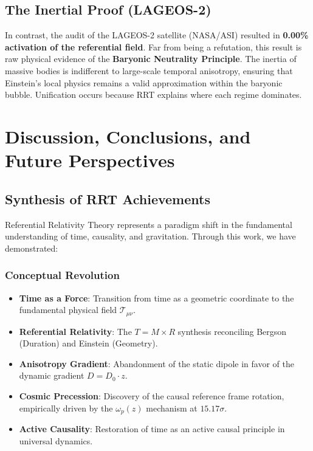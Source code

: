 \documentclass[12pt,a4paper]{article}
\begin{document}
\subsection{The Inertial Proof (LAGEOS-2)}
In contrast, the audit of the LAGEOS-2 satellite (NASA/ASI) resulted in \textbf{0.00\% activation of the referential field}. Far from being a refutation, this result is raw physical evidence of the \textbf{Baryonic Neutrality Principle}. The inertia of massive bodies is indifferent to large-scale temporal anisotropy, ensuring that Einstein’s local physics remains a valid approximation within the baryonic bubble. Unification occurs because RRT explains where each regime dominates.

\section{Discussion, Conclusions, and Future Perspectives}

\subsection{Synthesis of RRT Achievements}
Referential Relativity Theory represents a paradigm shift in the fundamental understanding of time, causality, and gravitation. Through this work, we have demonstrated:

\subsubsection{Conceptual Revolution}
\begin{itemize}
    \item \textbf{Time as a Force}: Transition from time as a geometric coordinate to the fundamental physical field $\mathcal{T}_{\mu\nu}$.
    \item \textbf{Referential Relativity}: The $T = M \times R$ synthesis reconciling Bergson (Duration) and Einstein (Geometry).
    \item \textbf{Anisotropy Gradient}: Abandonment of the static dipole in favor of the dynamic gradient $D = D_0 \cdot z$.
   \item \textbf{Cosmic Precession}: Discovery of the causal reference frame rotation, empirically driven by the $\omega_p(z)$ mechanism at $15.17\sigma$.
    \item \textbf{Active Causality}: Restoration of time as an active causal principle in universal dynamics.
\end{itemize}
\end{document}

